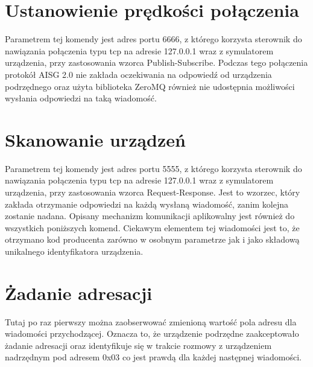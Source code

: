     \section{Ustanowienie prędkości połączenia}
    Parametrem tej komendy jest adres portu 6666, z którego korzysta sterownik
    do nawiązania połączenia typu tcp na adresie 127.0.0.1 wraz z symulatorem urządzenia,
    przy zastosowania wzorca Publish-Subscribe. Podczas tego połączenia protokół AISG 2.0 
    nie zakłada oczekiwania na odpowiedź od urządzenia podrzędnego oraz użyta biblioteka
    ZeroMQ również nie udostępnia możliwości wysłania odpowiedzi na taką wiadomość.

    \section{Skanowanie urządzeń}
    Parametrem tej komendy jest adres portu 5555, z którego korzysta sterownik
    do nawiązania połączenia typu tcp na adresie 127.0.0.1 wraz z symulatorem urządzenia,
    przy zastosowania wzorca Request-Response. Jest to wzorzec, który zakłada otrzymanie 
    odpowiedzi na każdą wysłaną wiadomość, zanim kolejna zostanie nadana. Opisany mechanizm komunikacji
    aplikowalny jest również do wszystkich poniższych komend.
    Ciekawym elementem tej wiadomości jest to, że otrzymano kod producenta zarówno
    w osobnym parametrze jak i jako składową unikalnego identyfikatora urządzenia.

    \section{Żadanie adresacji}
    Tutaj po raz pierwszy można zaobserwować zmienioną wartość pola adresu dla wiadomości
    przychodzącej. Oznacza to, że urządzenie podrzędne zaakceptowało żadanie adresacji 
    oraz identyfikuje się w trakcie rozmowy z urządzeniem nadrzędnym pod adresem 0x03 co
    jest prawdą dla każdej następnej wiadomości.
 

